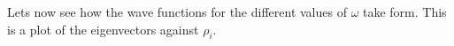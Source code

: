 \documentclass[norsk,a4paper,12pt]{article}
\begin{document}
Lets now see how the wave functions for the different values of $\omega$ take form. This is a plot of the eigenvectors against
$\rho_i$.

\begin{figure}[H]
  \begin{center}

\end{center}
\end{figure}
\end{document}
